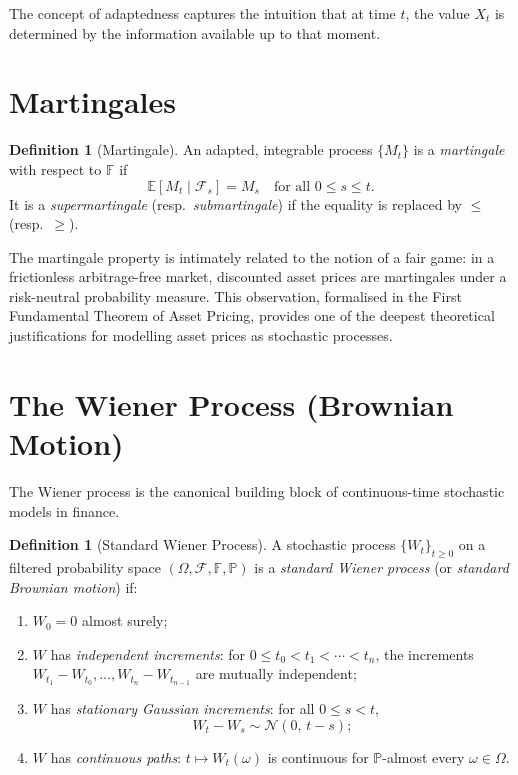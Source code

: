 \documentclass[12pt, a4paper, oneside]{report}
\theoremstyle{plain}
\theoremstyle{definition}
\newtheorem{definition}[theorem]{Definition}
\theoremstyle{remark}
\newcommand{\Prob}{\mathbb{P}}
\newcommand{\E}{\mathbb{E}}
\newcommand{\F}{\mathcal{F}}
\begin{document}
The concept of adaptedness captures the intuition that at time $t$, the value
$X_t$ is determined by the information available up to that moment.

\section{Martingales}

\begin{definition}[Martingale]
An adapted, integrable process $\{M_t\}$ is a \emph{martingale} with respect to
$\mathbb{F}$ if
\[
  \E[M_t \mid \F_s] = M_s \quad \text{for all } 0 \leq s \leq t.
\]
It is a \emph{supermartingale} (resp.\ \emph{submartingale}) if the equality is
replaced by $\leq$ (resp.\ $\geq$).
\end{definition}

The martingale property is intimately related to the notion of a fair game: in a
frictionless arbitrage-free market, discounted asset prices are martingales under
a risk-neutral probability measure.  This observation, formalised in the First
Fundamental Theorem of Asset Pricing, provides one of the deepest theoretical
justifications for modelling asset prices as stochastic processes.

\section{The Wiener Process (Brownian Motion)}

The Wiener process is the canonical building block of continuous-time stochastic
models in finance.

\begin{definition}[Standard Wiener Process]
\label{def:bm}
A stochastic process $\{W_t\}_{t \geq 0}$ on a filtered probability space
$(\Omega, \F, \mathbb{F}, \Prob)$ is a \emph{standard Wiener process} (or
\emph{standard Brownian motion}) if:
\begin{enumerate}[leftmargin=1.25cm, label=\textup{(W\arabic*)}]
  \item $W_0 = 0$ almost surely;
  \item $W$ has \emph{independent increments}: for $0 \leq t_0 < t_1 < \cdots < t_n$,
    the increments $W_{t_1} - W_{t_0}, \ldots, W_{t_n} - W_{t_{n-1}}$ are
    mutually independent;
  \item $W$ has \emph{stationary Gaussian increments}: for all $0 \leq s < t$,
    \[
      W_t - W_s \sim \mathcal{N}(0,\, t - s);
    \]
  \item $W$ has \emph{continuous paths}: $t \mapsto W_t(\omega)$ is continuous
    for $\Prob$-almost every $\omega \in \Omega$.
\end{enumerate}
\end{definition}
\end{document}
